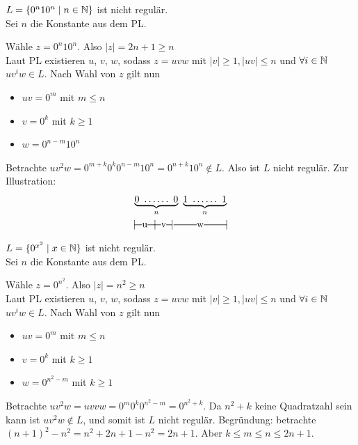 \begin{Bsp*}
	$L=\{0^n10^n \mid n\in\mathbb{N}\}$ ist nicht regulär.\\
	Sei $n$ die Konstante aus dem \ac{PL}.
	
	Wähle $z=0^n10^n$. Also $|z|=2n+1\geq n$\\
	Laut PL existieren $u$, $v$, $w$, sodass $z=uvw$ mit $|v|\geq 1, |uv|\leq n$ und $\forall i \in \mathbb{N}$ $uv^iw \in L$. Nach Wahl von $z$ gilt nun
  \begin{itemize}
  \item $uv = 0^m$ mit $m\leq n$
  \item $v = 0^k$ mit $k\geq 1$
  \item $w = 0^{n-m}10^n$ 
  \end{itemize}
  Betrachte $uv^2w = 0^{m+k}0^k0^{n-m}10^n = 0^{n+k}10^n \notin L$.
  Also ist $L$ nicht regulär.
  Zur Illustration:
	\begin{gather*}
		\underbrace{0\ \dots\dots\ 0}_{n} \ \underbrace{1\ \dots\dots\ 1}_{n}\\
		|\!\ruleplaceholder[u]{\widthof{0\ \dots }} \!|\! \ruleplaceholder[v]{\widthof{\dots 0}}\!|%
		\ruleplaceholder[w]{\widthof{\ \ \ $1\ \dots\dots\ 1$}}\!|
	\end{gather*}
  
\end{Bsp*}
\begin{Bsp*}
	$L=\{0^{x^2} \mid x\in\mathbb{N}\}$ ist nicht regulär.\\
	Sei $n$ die Konstante aus dem \ac{PL}.
	
	Wähle $z=0^{n^2}$. Also $|z|=n^2\geq n$\\
	Laut PL existieren $u$, $v$, $w$, sodass $z=uvw$ mit $|v|\geq 1, |uv|\leq n$ und $\forall i \in \mathbb{N}$ $uv^iw \in L$. Nach Wahl von $z$ gilt nun
  \begin{itemize}
  \item $uv = 0^m$ mit $m\leq n$
  \item $v = 0^k$ mit $k\geq 1$
  \item $w = 0^{n^2 - m}$ mit $k\geq 1$
  \end{itemize}
  Betrachte $uv^2w = uvvw = 0^{m}0^k0^{n^2-m} = 0^{n^2+k}$.
  Da $n^2+k$ keine Quadratzahl sein kann ist $uv^2w \not \in L$, und somit ist $L$ nicht regulär.
  Begründung: betrachte $(n+1)^2 - n^2 = n^2 + 2n + 1 - n^2 = 2n + 1$.
  Aber $k \le m \le n \le 2n + 1$.
\end{Bsp*}

